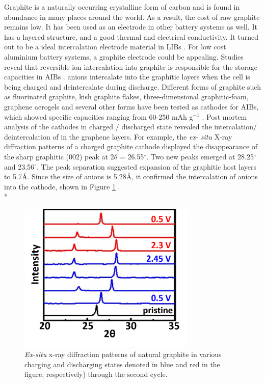 Graphite is a naturally occurring crystalline form of carbon and is found in abundance in many places around the world. As a result, the cost of raw graphite remains low. It has been used as an electrode in other battery systems as well. It has a layered structure, and a good thermal and electrical conductivity. It turned out to be a ideal intercalation electrode material in LIBs \cite{ji_recent_2011, yoo_large_2008, lian_large_2010}. For low cost aluminium battery systems, a graphite electrode could be appealing. Studies reveal that reversible ion intercalation into graphite is responsible for the storage capacities in AIBs \cite{rani_fluorinated_2013, lin_ultrafast_2015}.  anions intercalate into the graphitic layers when the cell is being charged and deintercalate during discharge. Different forms of graphite such as fluorinated graphite, kish graphite flakes, three-dimensional graphitic-foam, graphene aerogels and several other forms have been tested as cathodes for AIBs, which showed specific capacities ranging from 60-250 mAh g$^{-1}$ \cite{rani_fluorinated_2013, wang_kish_2017, wu_3d_2016, huang_graphene_2019}. Post mortem analysis of the cathodes in charged / discharged state revealed the intercalation/ deintercalation of  in the graphene layers. For example, the \textit{ex- situ} X-ray diffraction patterns of a charged graphite cathode displayed the disappearance of the sharp graphitic (002) peak at 2$\theta$ = 26.55$^{\circ}$. Two new peaks emerged at 28.25$^{\circ}$ and 23.56$^{\circ}$. The peak separation suggested expansion of the graphitic host layers to 5.7\AA. Since the size of  anions is 5.28\AA, it confirmed the intercalation of  anions into the cathode, shown in Figure \ref{Figures/chap5fig:ramanpap} \cite{lin_ultrafast_2015, wang_kish_2017}. \\*

 \begin{figure}[h]
  \centering
  \includegraphics[width=0.75\textwidth]{Figures/chap5fig/ramanpap}
    \caption{\textit{Ex-situ} x-ray diffraction patterns of natural graphite in various charging and discharging states denoted in blue and red in the figure, respectively) through the second cycle. \cite{wang_advanced_2017}}
  \label{Figures/chap5fig:ramanpap}
\end{figure}

